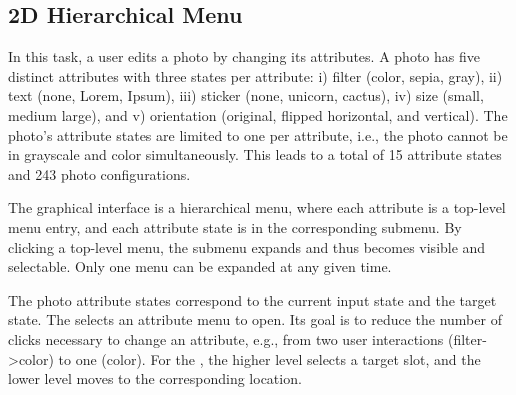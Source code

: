 
\subsection{2D Hierarchical Menu}
\label{sec:photo}
In this task, a user edits a photo by changing its attributes. A photo has five distinct attributes with three states per attribute: i) filter (color, sepia, gray), ii) text (none, Lorem, Ipsum), iii) sticker (none, unicorn, cactus), iv) size (small, medium large), and v) orientation (original, flipped horizontal, and vertical). The photo's attribute states are limited to one per attribute, i.e., the photo cannot be in grayscale and color simultaneously. This leads to a total of 15 attribute states and 243 photo configurations. 

The graphical interface is a hierarchical menu, where each attribute is a top-level menu entry, and each attribute state is in the corresponding submenu. By clicking a top-level menu, the submenu expands and thus becomes visible and selectable. Only one menu can be expanded at any given time. 

The photo attribute states correspond to the current input state and the target state. The \interfaceagent selects an attribute menu to open. Its goal is to reduce the number of clicks necessary to change an attribute, e.g., from two user interactions (filter->color) to one (color). For the \emph{\useragent}, the higher level selects a target slot, and the lower level moves to the corresponding location. 

